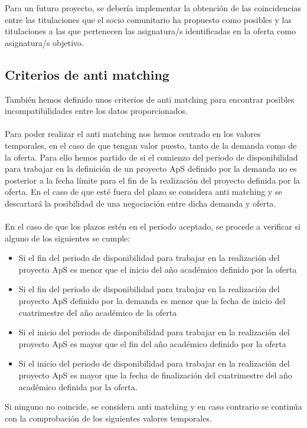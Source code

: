 \documentclass[11pt]{book}
\begin{document}
	Para un futuro proyecto, se debería implementar la obtención de las coincidencias entre las
	titulaciones que el socio comunitario ha propuesto como posibles y las
	titulaciones a las que pertenecen las asignatura/s identificadas en la
	oferta como asignatura/s objetivo. 

\subsection{Criterios de anti matching }

También hemos definido unos criterios de anti matching para encontrar posibles incompatibilidades entre los datos proporcionados.\\\\
Para poder realizar el anti matching nos hemos centrado en los valores temporales, en el caso de que tengan valor puesto, tanto de la demanda como de la oferta. Para ello hemos partido de si el comienzo del periodo de disponibilidad para trabajar en la definición
de un proyecto ApS definido por la demanda no es posterior a la fecha límite para el fin de la realización del proyecto definida por la oferta. En el caso de que esté fuera del plazo se considera anti matching y se descartará la posibilidad de una negociación entre dicha demanda y oferta. \\\\

En el caso de que los plazos estén en el periodo aceptado, se procede a verificar si alguno de los siguientes se cumple:
\begin{itemize}
	\item Si el fin del periodo de disponibilidad para trabajar en la realización del proyecto ApS es menor que el inicio del año académico definido por la oferta
	\item Si el fin del periodo de disponibilidad para trabajar en la realización del
	proyecto ApS definido por la demanda es menor que la fecha de inicio del cuatrimestre del año académico de la oferta 
	\item Si el inicio del periodo de disponibilidad para trabajar en la realización del
	proyecto ApS es mayor que el fin del año académico definido por la oferta 
	\item Si el inicio del periodo de disponibilidad para trabajar en la realización del
	proyecto ApS es mayor que la fecha de finalización del cuatrimestre del año académico definida por la  oferta.\\
\end{itemize}
 Si ninguno no coincide, se considera anti matching y en caso contrario se continúa con la comprobación de los siguientes valores temporales.\\\\
\end{document}
